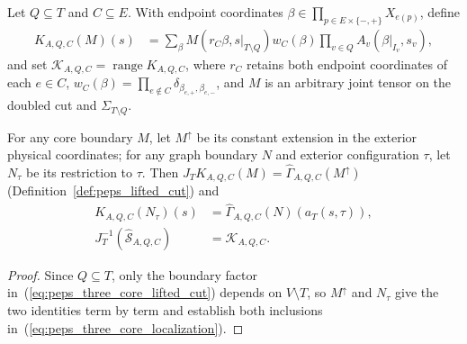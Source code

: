 \begin{definition}%
    \label{def:peps_three_core_lifted_cut}
    \leanok
    Let $Q\subseteq T$ and $C\subseteq E$. With endpoint coordinates
    $\beta\in\prod_{p\in E\times\{-,+\}}X_{e(p)}$, define
    \begin{align}
        K_{A,Q,C}(M)(s)
         & =\sum_\beta M(r_C\beta,s|_{T\setminus Q})w_C(\beta)
        \prod_{v\in Q}A_v(\beta|_{I_v},s_v),
        \label{eq:peps_three_core_lifted_cut}
    \end{align}
    and set $\mathcal K_{A,Q,C}=\operatorname{range}K_{A,Q,C}$, where $r_C$
    retains both endpoint coordinates of each $e\in C$,
    $w_C(\beta)=\prod_{e\notin C}\delta_{\beta_{e,+},\beta_{e,-}}$, and $M$ is
    an arbitrary joint tensor on the doubled cut and $\Sigma_{T\setminus Q}$.
\end{definition}

\begin{lemma}%
    \label{thm:peps_three_core_localization}
    \leanok
    For any core boundary $M$, let $M^\uparrow$ be its constant extension in
    the exterior physical coordinates; for any graph boundary $N$ and exterior
    configuration $\tau$, let $N_\tau$ be its restriction to $\tau$. Then
    $J_TK_{A,Q,C}(M)=\widehat\Gamma_{A,Q,C}(M^\uparrow)$
    (Definition~\ref{def:peps_lifted_cut}) and
    \begin{align}
        K_{A,Q,C}(N_\tau)(s)
                                               & =\widehat\Gamma_{A,Q,C}(N)(a_T(s,\tau)),\nonumber \\
        J_T^{-1}(\widehat{\mathcal S}_{A,Q,C}) & =\mathcal K_{A,Q,C}.
        \label{eq:peps_three_core_localization}
    \end{align}
\end{lemma}
\begin{proof}\leanok
    Since $Q\subseteq T$, only the boundary factor in~(\ref{eq:peps_three_core_lifted_cut})
    depends on $V\setminus T$, so $M^\uparrow$ and $N_\tau$ give the two
    identities term by term and establish both inclusions in~(\ref{eq:peps_three_core_localization}).
\end{proof}

